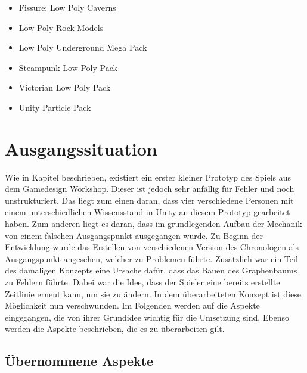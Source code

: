 \begin{itemize}  
    \item Fissure: Low Poly Caverns \cite{noauthor_fissure_nodate}
    \item Low Poly Rock Models \cite{noauthor_low_lprm}
    \item Low Poly Underground Mega Pack \cite{noauthor_low_nodate}
    \item Steampunk Low Poly Pack \cite{noauthor_steampunk_lp}
    \item Victorian Low Poly Pack \cite{noauthor_victorian_nodate}
    \item Unity Particle Pack \cite{noauthor_unity_nodate}
\end{itemize}


\section{Ausgangssituation}
Wie in Kapitel  beschrieben, existiert ein erster kleiner Prototyp des Spiels aus dem Gamedesign Workshop. Dieser ist jedoch sehr anfällig für Fehler und noch unstrukturiert. Das liegt zum einen daran, dass vier verschiedene Personen mit einem unterschiedlichen Wissensstand in Unity an diesem Prototyp gearbeitet haben. Zum anderen liegt es daran, dass im grundlegenden Aufbau der Mechanik von einem falschen Ausgangspunkt ausgegangen wurde. Zu Beginn der Entwicklung wurde das Erstellen von verschiedenen Version des Chronologen als Ausgangspunkt angesehen, welcher zu Problemen führte. Zusätzlich war ein Teil des damaligen Konzepts eine Ursache dafür, dass das Bauen des Graphenbaums zu Fehlern führte. Dabei war die Idee, dass der Spieler eine bereits erstellte Zeitlinie erneut  kann, um sie zu ändern. In dem überarbeiteten Konzept ist diese Möglichkeit nun verschwunden. Im Folgenden werden auf die Aspekte eingegangen, die von ihrer Grundidee wichtig für die Umsetzung sind. Ebenso werden die  Aspekte beschrieben, die es zu überarbeiten gilt.
\subsection{Übernommene Aspekte}
